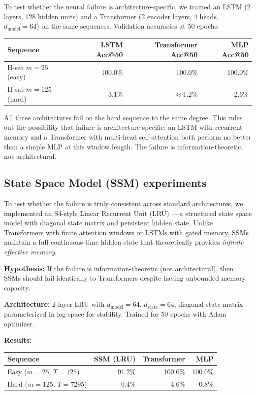 \documentclass[11pt]{article}
\theoremstyle{plain}
\theoremstyle{definition}
\begin{document}
To test whether the neural failure is architecture-specific, we trained an LSTM (2 layers, 128 hidden units) and a Transformer (2 encoder layers, 4 heads, $d_{\mathrm{model}}=64$) on the same sequences. Validation accuracies at 50 epochs:

\begin{center}
\begin{tabular}{lrrr}
\toprule
Sequence & LSTM Acc@50 & Transformer Acc@50 & MLP Acc@50\\
\midrule
H-sat $m=25$ (easy) & 100.0\% & 100.0\% & 100.0\%\\
H-sat $m=125$ (hard) & 3.1\% & $\approx$1.2\% & 2.6\%\\
\bottomrule
\end{tabular}
\end{center}

All three architectures fail on the hard sequence to the same degree. This rules out the possibility that failure is architecture-specific: an LSTM with recurrent memory and a Transformer with multi-head self-attention both perform no better than a simple MLP at this window length. The failure is information-theoretic, not architectural.

\subsection{State Space Model (SSM) experiments}
\label{sec:results:ssm}

To test whether the failure is truly consistent across standard architectures, we implemented an S4-style Linear Recurrent Unit (LRU)~\citep{Orvieto2023}---a structured state space model with diagonal state matrix and persistent hidden state. Unlike Transformers with finite attention windows or LSTMs with gated memory, SSMs maintain a full continuous-time hidden state that theoretically provides \emph{infinite effective memory}.

\textbf{Hypothesis:} If the failure is information-theoretic (not architectural), then SSMs should fail identically to Transformers despite having unbounded memory capacity.

\textbf{Architecture:} 2-layer LRU with $d_{\mathrm{model}}=64$, $d_{\mathrm{state}}=64$, diagonal state matrix parameterized in log-space for stability. Trained for 50 epochs with Adam optimizer.

\textbf{Results:}
\begin{center}
\begin{tabular}{lrrr}
\toprule
Sequence & SSM (LRU) & Transformer & MLP\\
\midrule
Easy ($m=25$, $T=125$) & 91.2\% & 100.0\% & 100.0\%\\
Hard ($m=125$, $T=7295$) & 0.4\% & 4.6\% & 0.8\%\\
\bottomrule
\end{tabular}
\end{center}
\end{document}

